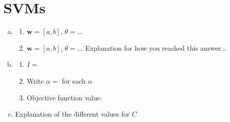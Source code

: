\documentclass{article}
\begin{document}
\section*{SVMs}
\begin{enumerate}[(a)]
    \item \begin{enumerate}[1.]
        \item $\mathbf{w} = [a, b]$, $\theta = ...$
        \item $\mathbf{w} = [a, b]$, $\theta = ...$
        Explanation for how you reached this answer...
    \end{enumerate}
    \item \begin{enumerate}[1.]
        \item $I = $
        \item Write $\alpha = $ for each $\alpha$
        \item Objective function value:
    \end{enumerate}
    \item Explanation of the different values for $C$
\end{enumerate}
\end{document}
